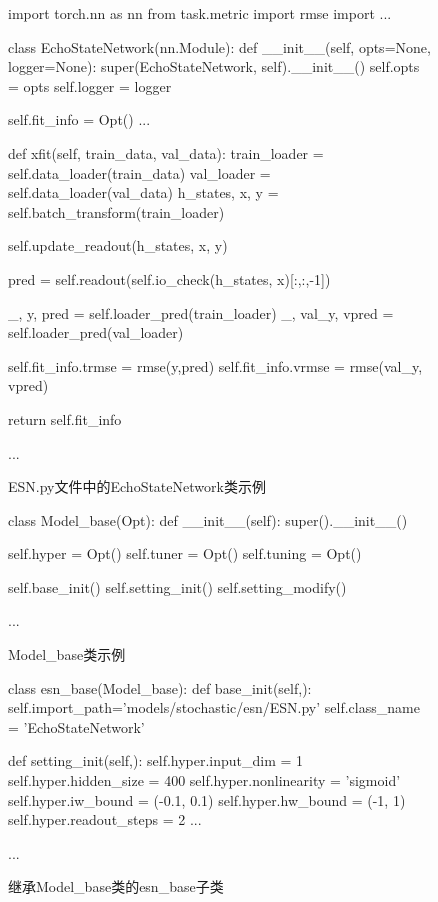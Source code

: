 \begin{figure}[t!]
    \begin{python}
import torch.nn as nn
from task.metric import rmse
import ...

class EchoStateNetwork(nn.Module):
    def __init__(self, opts=None, logger=None):
        super(EchoStateNetwork, self).__init__()
        self.opts = opts
        self.logger = logger
        
        self.fit_info = Opt()
        ...

    def xfit(self, train_data, val_data):
        train_loader = self.data_loader(train_data)
        val_loader = self.data_loader(val_data)
        h_states, x, y = self.batch_transform(train_loader)
        
        self.update_readout(h_states, x, y)
        
        pred = self.readout(self.io_check(h_states, x)[:,:,-1])
        
        _, y, pred = self.loader_pred(train_loader)
        _, val_y, vpred = self.loader_pred(val_loader)

        self.fit_info.trmse = rmse(y,pred)
        self.fit_info.vrmse = rmse(val_y, vpred)

        return self.fit_info
    
    ...
    \end{python}
    \caption{ESN.py文件中的EchoStateNetwork类示例\label{fig:ch.univ.esn}} 
\end{figure}



\begin{figure}[t!]
    \begin{python}
        class Model_base(Opt):
            def __init__(self):
                super().__init__()
                
                self.hyper = Opt()
                self.tuner = Opt()
                self.tuning = Opt()

                self.base_init()
                self.setting_init()
                self.setting_modify()

            ...
    \end{python}
    \caption{Model_base类示例\label{fig:ch.univ.mb} }
\end{figure}


\begin{figure}[t!]
    \begin{python}
        class esn_base(Model_base):
            def base_init(self,):
                self.import_path='models/stochastic/esn/ESN.py'
                self.class_name = 'EchoStateNetwork'

            def setting_init(self,):
                self.hyper.input_dim = 1
                self.hyper.hidden_size = 400
                self.hyper.nonlinearity = 'sigmoid'
                self.hyper.iw_bound = (-0.1, 0.1)
                self.hyper.hw_bound = (-1, 1)
                self.hyper.readout_steps = 2
                ...

            ...
    \end{python}
    \caption{继承Model_base类的esn_base子类\label{fig:ch.univ.esn_base} }
\end{figure}

